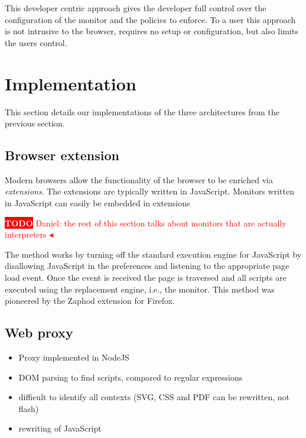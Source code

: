 \documentclass{llncs}
\newcommand{\todo}[1]{\colorbox{red}{\textcolor{white}{\sffamily\bfseries\scriptsize TODO}} \textcolor{red}{#1} \textcolor{red}{$\blacktriangleleft$}}
\begin{document}
This developer centric approach gives the developer full control over the 
configuration of the monitor and the policies to enforce. To a user this 
approach is not intrusive to the browser, requires no setup or configuration, 
but also limits the users control. 


\section{Implementation}
\label{sec:impl}

This section details our implementations of the three architectures
from the previous section. 


\subsection{Browser extension}

Modern browsers allow the functionality of the browser to be enriched via
\emph{extensions}. The extensions are typically written in JavaScript.  
Monitors written in JavaScript can easily be embedded in extensions

\todo{Daniel: the rest of this section talks about monitors that are actually interpreters}

The method works by turning off the standard execution engine for JavaScript
by disallowing JavaScript in the preferences and listening to the appropriate
page load event. Once the event is received the page is traversed and all
scripts are executed using the replacement engine, i.e., the monitor. This
method was pioneered by the Zaphod \cite{Zaphod} extension for Firefox.



\subsection{Web proxy}

\begin{itemize}
\item Proxy implemented in NodeJS
\item DOM parsing to find scripts, compared to regular expressions
\item difficult to identify all contexts (SVG, CSS and PDF can be rewritten, not flash)
\item rewriting of JavaScript
\end{itemize}
\end{document}
